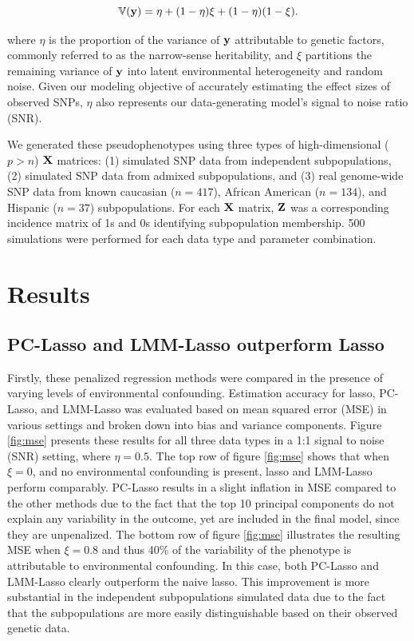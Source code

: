 \begin{equation}
    \label{eqn:parition_y}
    \mathbb{V}(\textbf{y}) = \eta + (1 - \eta) \xi + (1-\eta)(1-\xi).
\end{equation}

where $\eta$ is the proportion of the variance of $\textbf{y}$ attributable to genetic factors, commonly referred to as the narrow-sense heritability, and $\xi$ partitions the remaining variance of $\textbf{y}$ into latent environmental heterogeneity and random noise. Given our modeling objective of accurately estimating the effect sizes of observed SNPs, $\eta$ also represents our data-generating model's signal to noise ratio (SNR). 

We generated these pseudophenotypes using three types of high-dimensional ($p > n$) $\textbf{X}$ matrices: (1) simulated SNP data from independent subpopulations, (2) simulated SNP data from admixed subpopulations, and (3) real genome-wide SNP data from known caucasian ($n = 417$), African American ($n = 134$), and Hispanic ($n = 37$) subpopulations.  For each $\textbf{X}$ matrix, $\textbf{Z}$ was a corresponding incidence matrix of 1s and 0s identifying subpopulation membership. 500 simulations were performed for each data type and parameter combination.

\section{Results}

\subsection{PC-Lasso and LMM-Lasso outperform Lasso}
Firstly, these penalized regression methods were compared in the presence of varying levels of environmental confounding. Estimation accuracy for lasso, PC-Lasso, and LMM-Lasso was evaluated based on mean squared error (MSE) in various settings and broken down into bias and variance components.  Figure \ref{fig:mse} presents these results for all three data types in a 1:1 signal to noise (SNR) setting, where $\eta = 0.5$. The top row of figure \ref{fig:mse} shows that when $\xi = 0$, and no environmental confounding is present, lasso and LMM-Lasso perform comparably. PC-Lasso results in a slight inflation in MSE compared to the other methods due to the fact that the top 10 principal components do not explain any variability in the outcome, yet are included in the final model, since they are unpenalized. The bottom row of figure \ref{fig:mse} illustrates the resulting MSE when $\xi = 0.8$ and thus 40\% of the variability of the phenotype is attributable to environmental confounding. In this case, both PC-Lasso and LMM-Lasso clearly outperform the naive lasso. This improvement is more substantial in the independent subpopulations simulated data due to the fact that the subpopulations are more easily distinguishable based on their observed genetic data.

